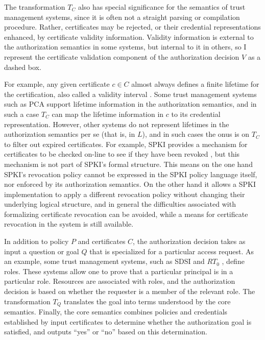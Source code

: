 The transformation $T_C$ also has special significance for the semantics of trust management
systems, since it is often not a straight parsing or compilation procedure. Rather, certificates
may be rejected, or their credential representations enhanced, by certificate validity
information. Validity information is external to the authorization semantics in some systems,
but internal to it in others, so I represent the certificate validation component of the
authorization decision $V$ as a dashed box.

For example, any given certificate $c \in C$ almost always defines a finite lifetime for the
certification, also called a validity interval \cite{winslett-adl97}. Some trust management
systems such as PCA \cite{Bauer:GFACSW} support lifetime information in the authorization
semantics, and in such a case $T_C$ can map the lifetime information in $c$ to its credential
representation. However, other systems do not represent lifetimes in the authorization semantics
per se (that is, in $L$), and in such cases the onus is on $T_C$ to filter out expired
certificates. For example, SPKI provides a mechanism for certificates to be checked on-line to
see if they have been revoked \cite{RFC-2693}, but this mechanism is not part of SPKI's formal
structure. This means on the one hand SPKI's revocation policy cannot be expressed in the SPKI
policy language itself, nor enforced by its authorization semantics. On the other hand it allows
a SPKI implementation to apply a different revocation policy without changing their underlying
logical structure, and in general the difficulties associated with formalizing certificate
revocation \cite{Stubblebine:RSAERDS,Stubblebine:ALSSRR,Rivest:CWECRL} can be avoided, while a
means for certificate revocation in the system is still available.

In addition to policy $P$ and certificates $C$, the authorization decision takes as input a
question or goal $Q$ that is specialized for a particular access request. As an example, some
trust management systems, such as SDSI and $RT_0$ \cite{Li:DRBTMF,Li:RRBTMF}, define roles.
These systems allow one to prove that a particular principal is in a particular role. Resources
are associated with roles, and the authorization decision is based on whether the requester is a
member of the relevant role. The transformation $T_Q$ translates the goal into terms understood
by the core semantics. Finally, the core semantics combines policies and credentials established
by input certificates to determine whether the authorization goal is satisfied, and outputs
``yes'' or ``no'' based on this determination.

